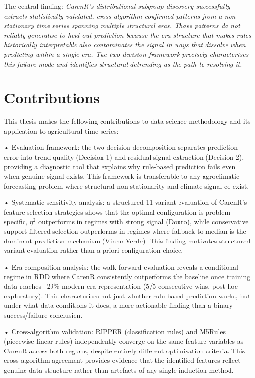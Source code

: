 The central finding: \textit{CarenR's distributional subgroup discovery successfully extracts statistically validated, cross-algorithm-confirmed patterns from a non-stationary time series spanning multiple structural eras. Those patterns do not reliably generalise to held-out prediction because the era structure that makes rules historically interpretable also contaminates the signal in ways that dissolve when predicting within a single era. The two-decision framework precisely characterises this failure mode and identifies structural detrending as the path to resolving it.}


\section{Contributions}\label{sec:contributions}

This thesis makes the following contributions to data science methodology and its application to agricultural time series:

\noindent •  Evaluation framework: the two-decision decomposition separates prediction error into trend quality (Decision 1) and residual signal extraction (Decision 2), providing a diagnostic tool that explains why rule-based prediction fails even when genuine signal exists. This framework is transferable to any agroclimatic forecasting problem where structural non-stationarity and climate signal co-exist.

\noindent •  Systematic sensitivity analysis: a structured 11-variant evaluation of CarenR's feature selection strategies shows that the optimal configuration is problem-specific, $\eta$$^2$ outperforms in regimes with strong signal (Douro), while conservative support-filtered selection outperforms in regimes where fallback-to-median is the dominant prediction mechanism (Vinho Verde). This finding motivates structured variant evaluation rather than a priori configuration choice.

\noindent •  Era-composition analysis: the walk-forward evaluation reveals a conditional regime in RDD where CarenR consistently outperforms the baseline once training data reaches ~29\% modern-era representation (5/5 consecutive wins, post-hoc exploratory). This characterises not just whether rule-based prediction works, but under what data conditions it does, a more actionable finding than a binary success/failure conclusion.

\noindent •  Cross-algorithm validation: RIPPER (classification rules) and M5Rules (piecewise linear rules) independently converge on the same feature variables as CarenR across both regions, despite entirely different optimisation criteria. This cross-algorithm agreement provides evidence that the identified features reflect genuine data structure rather than artefacts of any single induction method.

